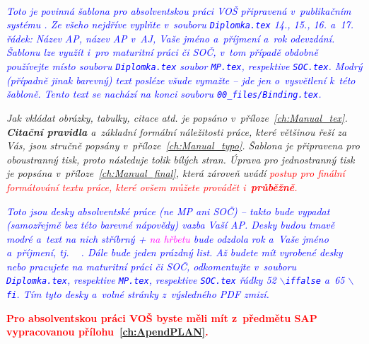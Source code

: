 ﻿%
\begin{center}
    \LARGE{\textsc{\HEAD}}\\

    \vglue 7cm

    \Huge{\textbf{\BookName}}
\end{center}

\vfill

\footnotesize{
\textcolor{blue}{\em Toto je povinná šablona pro absolventskou práci VOŠ připravená v~publikačním sys\-té\-mu \LaTeXe. Ze všeho nejdříve vyplňte v~souboru \texttt{Diplomka.tex} 14., 15., 16. a~17. řádek\?: Název AP, název AP v~AJ, Vaše jméno a~příjmení a~rok odevzdání. Šablonu lze využít i~pro maturitní práci či SOČ, v~tom případě obdobně používejte místo souboru \texttt{Diplomka.tex} soubor \texttt{MP.tex}, respektive \texttt{SOC.tex}. Modrý (pří\-pad\-ně jinak barevný) text posléze všude vymažte -- jde jen o~vysvětlení k~této šabloně. Tento text se nachází na konci souboru \texttt{00\_files/Binding.tex}.\/}

\textcolor{dmagenta}{\em Jak vkládat obrázky, tabulky, citace atd. je popsáno v~příloze~\ref{ch:Manual_tex}. \textbf{Citační pravidla} a~základní for\-mál\-ní náležitosti práce, které \LaTeXe\/ většinou řeší za Vás, jsou stručně popsány v~příloze~\ref{ch:Manual_typo}. Šablona je připravena pro oboustranný tisk, proto následuje tolik bílých stran. Úprava pro jednostranný tisk je popsána v~příloze~\ref{ch:Manual_final}, která zároveň uvádí\/} \textcolor{red}{\em postup pro finální formátování textu práce, které ovšem můžete provádět i~\textbf{průběžně}.\/}

\textcolor{blue}{\em Toto jsou desky absolventské práce (ne MP ani SOČ) -- takto bude vypadat (sa\-mo\-zřej\-mě bez této barevné nápovědy) vazba Vaší AP. Desky budou tmavě modré a~text na nich stříbrný + \textcolor{magenta}{na hřbetu} bude odzdola rok a~Vaše jméno a~příjmení, tj. \textcolor{magenta}{\Year \,\,\, \Author}. Dále bude jeden prázdný list. Až budete mít vyrobené desky nebo pracujete na maturitní práci či SOČ, odkomentujte v~souboru \texttt{Diplomka.tex}, respektive \texttt{MP.tex}, respektive \texttt{SOC.tex} řádky 52 $\backslash$\texttt{iffalse} a~65 $\backslash$\texttt{fi}. Tím tyto desky a~volné stránky z~výsledného PDF zmizí.\/}

\textcolor{red}{\textbf{Pro absolventskou práci VOŠ byste měli mít z~předmětu SAP vypracovanou přílohu~\ref{ch:ApendPLAN}.}}
}

\begin{flushleft}
    \textbf{\Large \Year \hfill \Author}
\end{flushleft}
